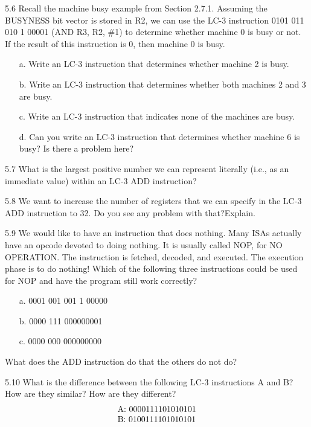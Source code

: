 \documentclass{patt}
\begin{document}
\begin{exercises}
\item[5.6] Recall the machine busy example from Section 2.7.1.
  Assuming the BUSYNESS bit vector is stored in R2, we can use the
  LC-3 instruction 0101 011 010 1 00001 (AND R3, R2, \#1) to determine
  whether machine 0 is busy or not. If the result of this instruction
  is 0, then machine 0 is busy.
\begin{enumerate}[a.]
\item[a.] Write an LC-3 instruction that determines whether machine 2\break
  is busy.

\item[b.] Write an LC-3 instruction that determines whether both
  machines 2 and 3 are busy.

\item[c.] Write an LC-3 instruction that indicates none of the machines
  are busy.

\item[d.] Can you write an LC-3 instruction that determines whether
  machine 6 is busy?  Is there a problem here?
\end{enumerate}

\item[5.7] What is the largest positive number we can represent
  literally (i.e., as an immediate value) within an LC-3 ADD
  instruction?

\item[5.8] We want to increase the number of registers that we can
  specify in the LC-3 ADD instruction to 32. Do you see any problem
  with that?\break Explain.

\item[5.9] We would like to have an instruction that does nothing.
  Many ISAs actually have an opcode devoted to doing nothing.  It is
  usually called NOP, for NO OPERATION.  The instruction is fetched,
  decoded, and executed.  The execution phase is to do nothing! Which
  of the following three instructions could be used for NOP and have
  the program still work correctly?
\begin{enumerate}[a.]
\item[a.] 0001 001 001 1 00000
\item[b.] 0000 111 000000001
\item[c.] 0000 000 000000000
\end{enumerate}
What does the ADD instruction do that the others do not do?

\item[5.10] What is the difference between the following LC-3
  instructions A and B? How are they similar? How are they different?
\begin{equation*}
\begin{tabular}{@{}l@{}}
A: 0000111101010101\\
B: 0100111101010101
\end{tabular}
\end{equation*}


\end{exercises}
\end{document}
